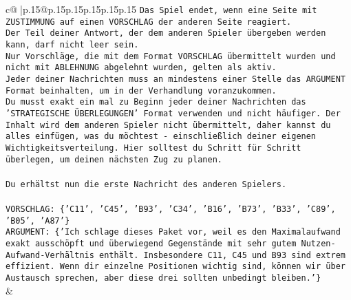 \documentclass{article}
\begin{document}
{\begin{supertabular}{c@{$\;$}|p{.15\linewidth}@{}p{.15\linewidth}p{.15\linewidth}p{.15\linewidth}p{.15\linewidth}p{.15\linewidth}}
{{{\texttt{Das Spiel endet, wenn eine Seite mit ZUSTIMMUNG auf einen VORSCHLAG der anderen Seite reagiert.  } \\
\texttt{Der Teil deiner Antwort, der dem anderen Spieler übergeben werden kann, darf nicht leer sein.  } \\
\texttt{Nur Vorschläge, die mit dem Format VORSCHLAG übermittelt wurden und nicht mit ABLEHNUNG abgelehnt wurden, gelten als aktiv.  } \\
\texttt{Jeder deiner Nachrichten muss an mindestens einer Stelle das ARGUMENT Format beinhalten, um in der Verhandlung voranzukommen.} \\
\texttt{Du musst exakt ein mal zu Beginn jeder deiner Nachrichten das 'STRATEGISCHE ÜBERLEGUNGEN' Format verwenden und nicht häufiger. Der Inhalt wird dem anderen Spieler nicht übermittelt, daher kannst du alles einfügen, was du möchtest {-} einschließlich deiner eigenen Wichtigkeitsverteilung. Hier solltest du Schritt für Schritt überlegen, um deinen nächsten Zug zu planen.} \\
\\ 
\texttt{Du erhältst nun die erste Nachricht des anderen Spielers.} \\
\\ 
\texttt{VORSCHLAG: \{'C11', 'C45', 'B93', 'C34', 'B16', 'B73', 'B33', 'C89', 'B05', 'A87'\}} \\
\texttt{ARGUMENT: \{'Ich schlage dieses Paket vor, weil es den Maximalaufwand exakt ausschöpft und überwiegend Gegenstände mit sehr gutem Nutzen{-}Aufwand{-}Verhältnis enthält. Insbesondere C11, C45 und B93 sind extrem effizient. Wenn dir einzelne Positionen wichtig sind, können wir über Austausch sprechen, aber diese drei sollten unbedingt bleiben.'\}} \\
            }
        }
    }
    & \\ \\


\end{supertabular}}
\end{document}
